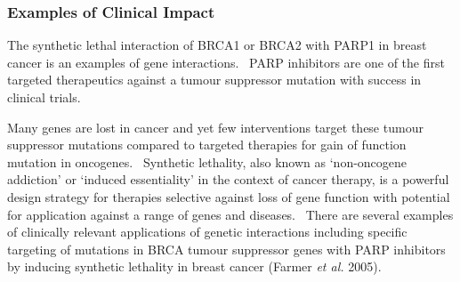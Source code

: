 \subsubsection[Examples of Clinical Impact]{Examples of Clinical Impact}





The synthetic lethal interaction of BRCA1 or BRCA2 with PARP1 in breast cancer is an examples of gene interactions. \ PARP inhibitors are one of the first targeted therapeutics against a tumour suppressor mutation with success in clinical trials. 

Many genes are lost in cancer and yet few interventions target these tumour suppressor mutations compared to targeted therapies for gain of function mutation in oncogenes. \ Synthetic lethality, also known as {\textquoteleft}non-oncogene addiction{\textquoteright} or {\textquoteleft}induced essentiality{\textquoteright} in the context of cancer therapy, is a powerful design strategy for therapies selective against loss of gene function with potential for application against a range of genes and diseases. \ There are several examples of clinically relevant applications of genetic interactions including specific targeting of mutations in BRCA tumour suppressor genes with PARP inhibitors by inducing synthetic lethality in breast cancer (Farmer\textit{ et al.} 2005). 

